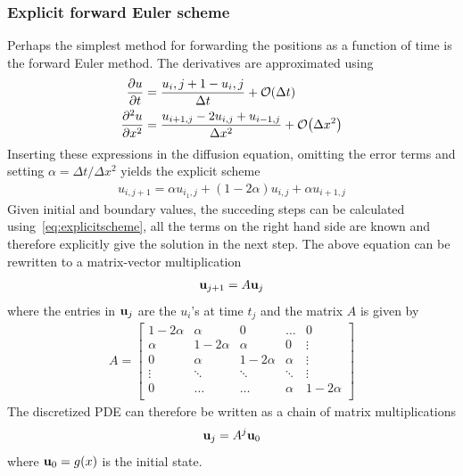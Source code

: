 \documentclass[aps,reprint]{revtex4-1}
\newcommand{\bigO}[1]{\ensuremath{\mathop{}\mathopen{}\mathcal{O}\mathopen{}\left(#1\right)}}
\begin{document}
\subsubsection{Explicit forward Euler scheme}
Perhaps the simplest method for forwarding the positions as a function of time
is the forward Euler method. The derivatives are approximated using
\begin{align*}
  \pdv{u}{t} &= \frac{u_i,j+1 - u_i,j}{\Delta{t}} + \bigO{\Delta{t}} \\
  \pdv[2]{u}{x} &= \frac{u_{i+1,j} - 2 u_{i,j} + u_{i-1, j}}{\Delta{x}^2} + \bigO{\Delta{x}^2}
\end{align*}
Inserting these expressions in the diffusion equation, omitting the error terms
and setting $\alpha = \Delta{t} / \Delta{x}^2$ yields the explicit scheme
\begin{align} \label{eq:explicitscheme}
  u_{i,j+1} = \alpha u_{i_1,j} + (1-2\alpha) u_{i,j} + \alpha u_{i+1,j}
\end{align}
Given initial and boundary values, the succeding steps can be calculated using~\ref{eq:explicitscheme},
all the terms on the right hand side are known and therefore explicitly give
the solution in the next step. The above equation can be rewritten to a matrix-vector
multiplication
\begin{align*}
  \vb{u}_{j+1} = A \vb{u}_j
\end{align*}
where the entries in $\vb{u}_j$ are the $u_i$'s at time $t_j$ and the matrix $A$ is
given by
\begin{align*}
  A = \begin{bmatrix}
        1 - 2\alpha & \alpha      & 0            & \hdots  & 0      \\
        \alpha      & 1 - 2\alpha & \alpha       & 0       & \vdots \\
        0           & \alpha      & 1 - 2\alpha  & \alpha  & \vdots \\
        \vdots      & \ddots      & \ddots       & \ddots  & \vdots \\
        0           & \hdots      & \hdots       & \alpha  & 1 - 2\alpha \\
      \end{bmatrix}
\end{align*}
The discretized PDE can therefore be written as a chain of matrix multiplications
\begin{align*}
  \vb{u}_{j} = A^{j} \vb{u}_0
\end{align*}
where $\vb{u}_0 = g(x)$ is the initial state.
\end{document}
